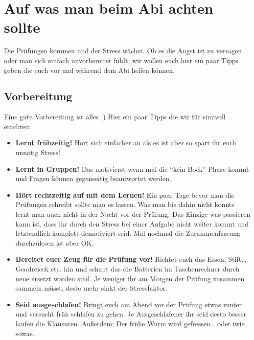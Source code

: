\chapter{Auf was man beim Abi achten sollte}
	Die Prüfungen kommen und der Stress wächst. Ob es die Angst ist zu versagen
	oder man sich einfach unvorbereitet fühlt, wir wollen euch hier ein paar Tipps
	geben die euch vor und während dem Abi helfen können.
	
	\section{Vorbereitung}
		Eine gute Vorbereitung ist alles :) Hier ein paar Tipps die wir für sinnvoll
		erachten:
		\begin{itemize}
		  \item \textbf{Lernt frühzeitig!} Hört sich einfacher an als es ist aber so
		  spart ihr euch unnötig Stress!
		  \item \textbf{Lernt in Gruppen!} Das motivierst wenn mal die "`kein Bock"'
		  Phase kommt und Fragen können gegenseitig beantwortet werden.
		  \item \textbf{Hört rechtzeitig auf mit dem Lernen!} Ein paar Tage bevor man
		  die Prüfungen schreibt sollte man es lassen. Was man bis dahin nicht konnte
		  lernt man auch nicht in der Nacht vor der Prüfung. Das Einzige was passieren
		  kann ist, dass ihr durch den Stress bei einer Aufgabe nicht weiter kommt und
		  letztendlich komplett demotiviert seid. Mal nochmal die Zusammenfassung
		  durchzulesen ist aber OK.
		  \item \textbf{Bereitet euer Zeug für die Prüfung vor!} Richtet euch das
		  Essen, Stifte, Geodreieck etc. hin und schaut das die Batterien im Taschenrechner
		  durch neue ersetzt worden sind. Je weniger ihr am Morgen der Prüfung
		  zusammen sammeln müsst, desto mehr sinkt der Stressfaktor.
		  \item \textbf{Seid ausgeschlafen!} Bringt euch am Abend vor der Prüfung
		  etwas runter und versucht früh schlafen zu gehen. Je Ausgeschlafener ihr seid desto
		  besser laufen die Klausuren. Außerdem: Der frühe Wurm wird gefressen\ldots
		  oder iwie sowas.
		\end{itemize}
		
